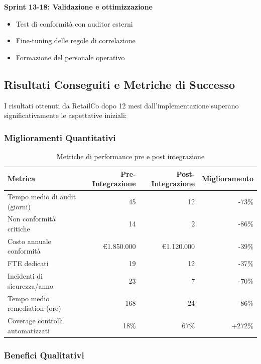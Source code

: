 \textbf{Sprint 13-18: Validazione e ottimizzazione}
\begin{itemize}
    \item Test di conformità con auditor esterni
    \item Fine-tuning delle regole di correlazione
    \item Formazione del personale operativo
\end{itemize}

\subsection{Risultati Conseguiti e Metriche di Successo}
\label{subsec:4.7.3_risultati}

I risultati ottenuti da RetailCo dopo 12 mesi dall'implementazione superano significativamente le aspettative iniziali:

\subsubsection{Miglioramenti Quantitativi}

\begin{table}[h]
\centering
\caption{Metriche di performance pre e post integrazione}
\label{tab:metriche_retailco}
\small
\begin{tabularx}{\textwidth}{|X|r|r|r|}
\hline
\textbf{Metrica} & \textbf{Pre-Integrazione} & \textbf{Post-Integrazione} & \textbf{Miglioramento} \\
\hline
Tempo medio di audit (giorni) & 45 & 12 & -73\% \\
\hline
Non conformità critiche & 14 & 2 & -86\% \\
\hline
Costo annuale conformità & €1.850.000 & €1.120.000 & -39\% \\
\hline
FTE dedicati & 19 & 12 & -37\% \\
\hline
Incidenti di sicurezza/anno & 23 & 7 & -70\% \\
\hline
Tempo medio remediation (ore) & 168 & 24 & -86\% \\
\hline
Coverage controlli automatizzati & 18\% & 67\% & +272\% \\
\hline
\end{tabularx}
\end{table}

\subsubsection{Benefici Qualitativi}

